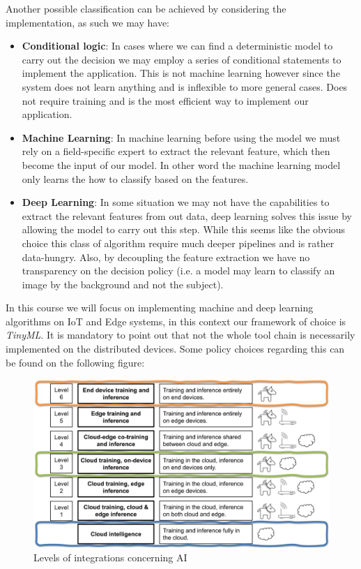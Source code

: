 \documentclass{article}
\begin{document}
      Another possible classification can be achieved by considering the implementation, as such we may have:
      \begin{itemize}
        \item \textbf{Conditional logic}: In cases where we can find a deterministic model to carry out the decision we may employ a series of conditional statements to implement the application.
        This is not machine learning however since the system does not learn anything and is inflexible to more general cases. Does not require training and is the most efficient way to implement our application.
        \item \textbf{Machine Learning}: In machine learning before using the model we must rely on a field-specific expert to extract the relevant feature, which then become the input of our model. In other word the machine learning
        model only learns the how to classify based on the features.
        \item \textbf{Deep Learning}: In some situation we may not have the capabilities to extract the relevant features from out data, deep learning solves this issue by allowing the model to carry out this step. While this seems like
        the obvious choice this class of algorithm require much deeper pipelines and is rather data-hungry. Also, by decoupling the feature extraction we have no transparency on the decision policy (i.e. a model may learn to classify an image by the background and not the subject).
      \end{itemize}

      In this course we will focus on implementing machine and deep learning algorithms on IoT and Edge systems, in this context our framework of choice is \emph{TinyML}. It is mandatory to point out that not the whole tool chain is necessarily implemented on the distributed devices.
      Some policy choices regarding this can be found on the following figure:
      \begin{figure}[H]
        \includegraphics[scale=0.25]{../Images/AITrainingLevels.jpg}
        \centering
        \caption{Levels of integrations concerning AI}
      \end{figure}
\end{document}
